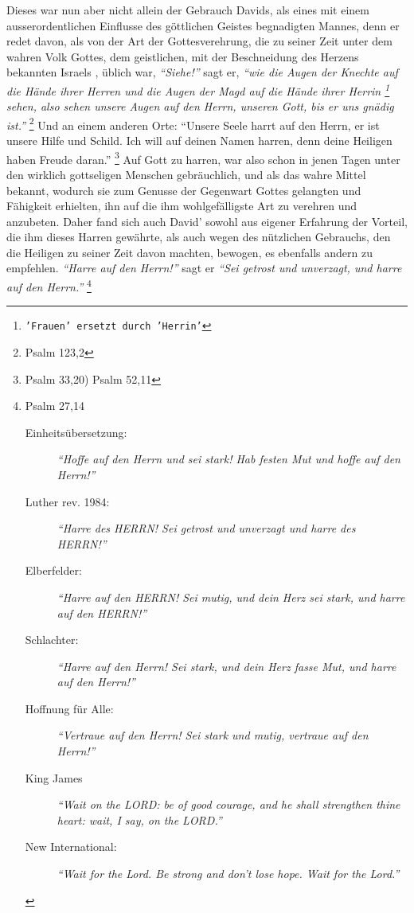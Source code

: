 \medskip

Dieses war nun aber nicht allein der Gebrauch Davids, als eines mit einem
ausserordentlichen Einflusse des göttlichen Geistes begnadigten Mannes, denn er
redet davon, als von der Art der Gottesverehrung, die zu seiner Zeit unter dem
wahren Volk Gottes, dem geistlichen, mit der
Beschneidung des Herzens  bekannten
Israels , üblich war, \textit{"`Siehe!"'} sagt er,
\textit{"`wie die Augen der Knechte auf die
Hände ihrer Herren und die Augen der Magd auf die Hände ihrer Herrin
\footnote{\texttt{'Frauen' ersetzt durch 'Herrin'}} sehen,
also sehen unsere Augen auf den Herrn, unseren Gott, bis er uns gnädig
ist."'} 
\footnote{Psalm 123,2}
Und an einem anderen Orte:
"`Unsere Seele harrt auf den Herrn, er ist unsere Hilfe und Schild. Ich will
auf deinen Namen harren,
denn deine Heiligen haben Freude daran."'
\footnote{Psalm 33,20)  Psalm 52,11}
Auf Gott zu harren, war also schon in jenen Tagen unter den wirklich gottseligen
Menschen gebräuchlich, und als das wahre Mittel bekannt, wodurch sie zum Genusse
der Gegenwart Gottes  gelangten und Fähigkeit
erhielten, ihn auf die ihm
wohlgefälligste Art zu verehren und anzubeten. Daher fand sich auch David'
sowohl aus eigener Erfahrung der Vorteil, die ihm
dieses Harren gewährte, als
auch wegen des nützlichen Gebrauchs, den die Heiligen zu seiner Zeit davon
machten, bewogen, es ebenfalls andern zu empfehlen.
\textit{"`Harre auf den Herrn!"'}  sagt
er
\textit{"`Sei getrost und unverzagt, und harre auf den Herrn."'}
\footnote{Psalm 27,14
\begin{description}
 \item[Einheitsübersetzung:] \textit{"`Hoffe auf den Herrn und sei stark! Hab
festen Mut und hoffe auf den Herrn!"'}
 \item[Luther rev. 1984:] \textit{"`Harre des HERRN! Sei getrost und unverzagt
und harre des HERRN!"'}
 \item[Elberfelder:] \textit{"`Harre auf den HERRN! Sei mutig, und dein Herz sei
stark, und harre auf den HERRN!"'}
 \item[Schlachter:] \textit{"`Harre auf den Herrn! Sei stark, und dein Herz
fasse Mut, und harre auf den Herrn!"'}
 \item[Hoffnung für Alle:] \textit{"`Vertraue auf den Herrn! Sei stark und
mutig, vertraue auf den Herrn!"'}
 \item[King James]
\textit{ "`Wait on the LORD: be of good courage, and he shall strengthen thine
heart: wait, I say, on the LORD."'}
 \item[New International:] \textit{ "`Wait for the Lord. Be strong and don't
lose hope. Wait for the Lord."'}
 \end{description}
}
